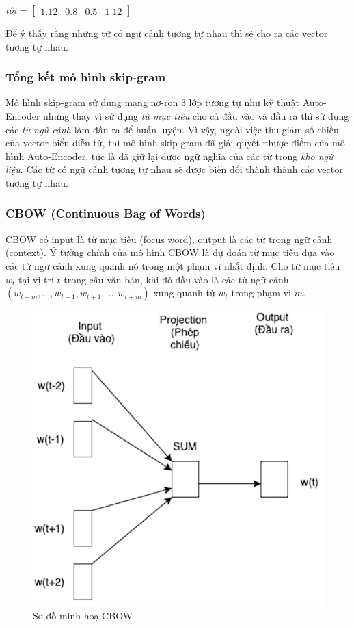\textit{tôi} = $\begin{bmatrix}
        1.12 & 0.8 & 0.5 & 1.12
    \end{bmatrix}$
    
Để ý thấy rằng những từ có ngữ cảnh tương tự nhau thì sẽ cho ra các vector tương tự nhau.

\subsubsection{Tổng kết mô hình skip-gram}
Mô hình skip-gram sử dụng mạng nơ-ron 3 lớp tương tự như kỹ thuật Auto-Encoder nhưng thay vì sử dụng \textit{từ mục tiêu} cho cả đầu vào và đầu ra thì sử dụng các \textit{từ ngữ cảnh} làm đầu ra để huấn luyện. Vì vậy, ngoài việc thu giảm số chiều của vector biểu diễn từ, thì mô hình skip-gram đã giải quyết nhược điểm của mô hình Auto-Encoder, tức là đã giữ lại được ngữ nghĩa của các từ trong \textit{kho ngữ liệu}. Các từ có ngữ cảnh tương tự nhau sẽ được biến đổi thành thành các vector tương tự nhau.

\subsubsection{CBOW (Continuous Bag of Words)}
CBOW có input là từ mục tiêu (focus word), output là các từ trong ngữ cảnh  (context). Ý tưởng chính của mô hình CBOW là dự đoán từ mục tiêu dựa vào các từ ngữ cảnh xung quanh nó trong một phạm vi nhất định. Cho từ mục tiêu $w_{t}$ tại vị trí $t$ trong câu văn bản, khi đó đầu vào là các từ ngữ cảnh $(w_{t-m}, ..., w_{t-1}, w_{t+1}, ..., w_{t+m})$ xung quanh từ $w_{t}$ trong phạm vi $m$. 
\clearpage
\begin{figure}[ht]
	\centering
		\includegraphics[width=0.5\columnwidth]{chapter04/figure/cbow_1.png}
        \caption{Sơ đồ minh hoạ CBOW }
        \label{fig:cbow1}
\end{figure} 

